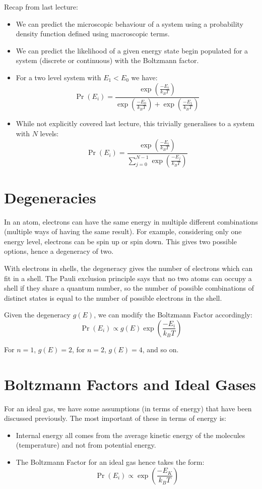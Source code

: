 
Recap from last lecture:

\begin{itemize}
    \item We can predict the microscopic behaviour of a system using a probability density function defined using macroscopic terms.
    \item We can predict the likelihood of a given energy state begin populated for a system (discrete or continuous) with the Boltzmann factor.
    \item For a two level system with $E_1 < E_0$ we have:
    \[
        \Pr\left(E_i\right) = \frac{\exp\left(\frac{-E_i}{k_B T}\right)}{\exp\left(\frac{-E_0}{k_B T}\right) + \exp\left(\frac{-E_1}{k_B T}\right)}
    \]
    \item While not explicitly covered last lecture, this trivially generalises to a system with $N$ levels:
    \[
        \Pr\left(E_i\right) = \frac{\exp\left(\frac{-E_i}{k_B T}\right)}{\sum_{j=0}^{N-1} \exp\left(\frac{-E_j}{k_B T}\right)}
    \]
\end{itemize}

\section{Degeneracies}
In an atom, electrons can have the same energy in multiple different combinations (multiple ways of having the same result). For example, considering only one energy level, electrons can be spin up or spin down. This gives two possible options, hence a degeneracy of two.

With electrons in shells, the degeneracy gives the number of electrons which can fit in a shell. The Pauli exclusion principle says that no two atoms can occupy a shell if they share a quantum number, so the number of possible combinations of distinct states is equal to the number of possible electrons in the shell.

Given the degeneracy $g(E)$, we can modify the Boltzmann Factor accordingly:
\[
    \Pr(E_i) \propto g(E) \exp\left(\frac{-E_i}{k_B T}\right)
\]

For $n = 1$, $g(E) = 2$, for $n = 2$, $g(E) = 4$, and so on.

\section{Boltzmann Factors and Ideal Gases}
For an ideal gas, we have some assumptions (in terms of energy) that have been discussed previously. The most important of these in terms of energy is:
\begin{itemize}
    \item Internal energy all comes from the average kinetic energy of the molecules (temperature) and not from potential energy.
    \item The Boltzmann Factor for an ideal gas hence takes the form:
    \[
        \Pr(E_i) \propto \exp\left(\frac{-E_K}{k_B T}\right)
    \]
\end{itemize}

